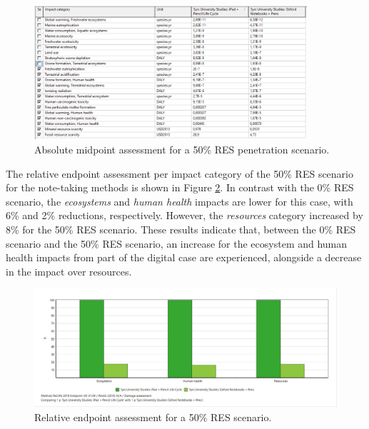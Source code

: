 \begin{figure}[H]
    \centering
    \includegraphics[width=0.9\textwidth]{images/RES_50/Characterization_Table_RES_50.PNG}
    \caption{Absolute midpoint assessment for a 50\% RES penetration scenario.}\label{fig:characterization_table_RES_50}
\end{figure}

The relative endpoint assessment per impact category of the 50\% RES scenario for the note-taking methods is shown in Figure \ref{fig:damage_assessment_RES_50}. In contrast with the 0\% RES scenario, the \textit{ecosystems} and \textit{human health} impacts are lower for this case, with 6\% and 2\% reductions, respectively. However, the \textit{resources} category increased by 8\% for the 50\% RES scenario. These results indicate that, between the 0\% RES scenario and the 50\% RES scenario, an increase for the ecosystem and human health impacts from part of the digital case are experienced, alongside a decrease in the impact over resources.  

\begin{figure}[H]
    \centering
    \includegraphics[width=\textwidth]{images/RES_50/Damage_Assessment_RES_50.JPG}
    \caption{Relative endpoint assessment for a 50\% RES scenario.}\label{fig:damage_assessment_RES_50}
\end{figure}

